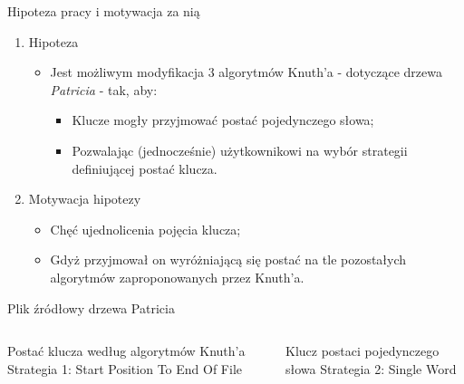 \documentclass[aspectratio=1610,english]{beamer} %
\begin{document}
	\begin{frame}{Hipoteza pracy i motywacja za nią}
	    \vspace*{-0.35cm} 
	    \begin{enumerate}
	        \addtolength{\itemindent}{-0.75cm}
	        \item Hipoteza
            \begin{itemize}
	            \addtolength{\itemindent}{-0.75cm}
                \item {\color{AGH@green} Jest możliwym modyfikacja 3 algorytmów} Knuth'a - dotyczące drzewa \emph{Patricia} - {\color{AGH@green}tak, aby:}
                \begin{itemize}
	                \addtolength{\itemindent}{-0.75cm}
                    \item {\color{AGH@green}Klucze mogły przyjmować postać pojedynczego słowa;} 
                    \item {\color{AGH@green}Pozwalając} (jednocześnie) {\color{AGH@green}użytkownikowi na wybór strategii definiującej postać klucza.}
                \end{itemize}
            \end{itemize}
	       
	       \item Motywacja hipotezy
	            \begin{itemize}
	                \addtolength{\itemindent}{-0.75cm}
	                \item {\color{AGH@green}Chęć ujednolicenia pojęcia klucza}; 
	                \item {\color{AGH@green}Gdyż przyjmował on wyróżniającą się postać} na tle pozostałych algorytmów \newline 
	                \hspace*{-0.75cm} zaproponowanych przez Knuth'a. 
	            \end{itemize} 
	    \end{enumerate}
	    
        \color{gray}
        \centering
        \usebox\FileContent \scriptsize \newline
        
        Plik źródłowy drzewa Patricia
        \vspace*{0.3cm}
	    \begin{columns}
	            \centering
	            \usebox\WordStrategySPTEOF \newline
	            
	            \vspace*{0.1cm}
	            \scriptsize Postać klucza według algorytmów Knuth'a \newline
	            Strategia 1: Start Position To End Of File
	            \centering
	            \usebox\WordStrategySingle \newline
	            
	            \vspace*{0.1cm}
	            \scriptsize Klucz postaci pojedynczego słowa \newline
	            Strategia 2: Single Word
	    \end{columns}
	\end{frame}
\end{document}
